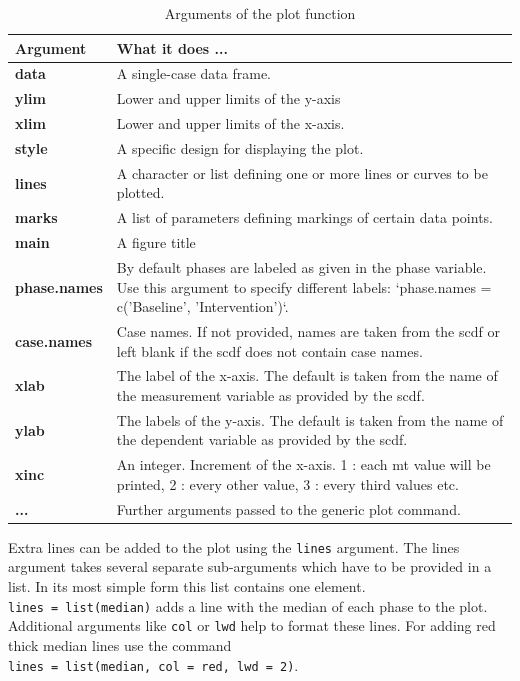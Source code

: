 \documentclass[
]{book}
\begin{document}
\begin{table}

\caption{\label{tab:table-plot-arguments}Arguments of the plot function}
\centering
\begin{tabular}[t]{>{\raggedright\arraybackslash}p{15em}>{\raggedright\arraybackslash}p{30em}}
\toprule
Argument & What it does ...\\
\midrule
\textbf{data} & A single-case data frame.\\
\textbf{ylim} & Lower and upper limits of the y-axis\\
\textbf{xlim} & Lower and upper limits of the x-axis.\\
\textbf{style} & A specific design for displaying the plot.\\
\textbf{lines} & A character or list defining one or more lines or curves to be plotted.\\
\addlinespace
\textbf{marks} & A list of parameters defining markings of certain data points.\\
\textbf{main} & A figure title\\
\textbf{phase.names} & By default phases are labeled as given in the phase variable. Use this argument to specify different labels: `phase.names = c('Baseline', 'Intervention')`.\\
\textbf{case.names} & Case names. If not provided, names are taken from the scdf or left blank if the scdf does not contain case names.\\
\textbf{xlab} & The label of the x-axis. The default is taken from the name of the measurement variable as provided by the scdf.\\
\addlinespace
\textbf{ylab} & The labels of the y-axis. The default is taken from the name of the dependent variable as provided by the scdf.\\
\textbf{xinc} & An integer. Increment of the x-axis. 1 : each mt value will be printed, 2 : every other value, 3 : every third values etc.\\
\textbf{...} & Further arguments passed to the generic plot command.\\
\bottomrule
\end{tabular}
\end{table}

Extra lines can be added to the plot using the \texttt{lines} argument. The lines argument takes several separate sub-arguments which have to be provided in a list. In its most simple form this list contains one element. \texttt{lines\ =\ list(\textquotesingle{}median\textquotesingle{})} adds a line with the median of each phase to the plot. Additional arguments like \texttt{col} or \texttt{lwd} help to format these lines. For adding red thick median lines use the command \texttt{lines\ =\ list(\textquotesingle{}median\textquotesingle{},\ col\ =\ \textquotesingle{}red\textquotesingle{},\ lwd\ =\ \textquotesingle{}2\textquotesingle{})}.
\end{document}
